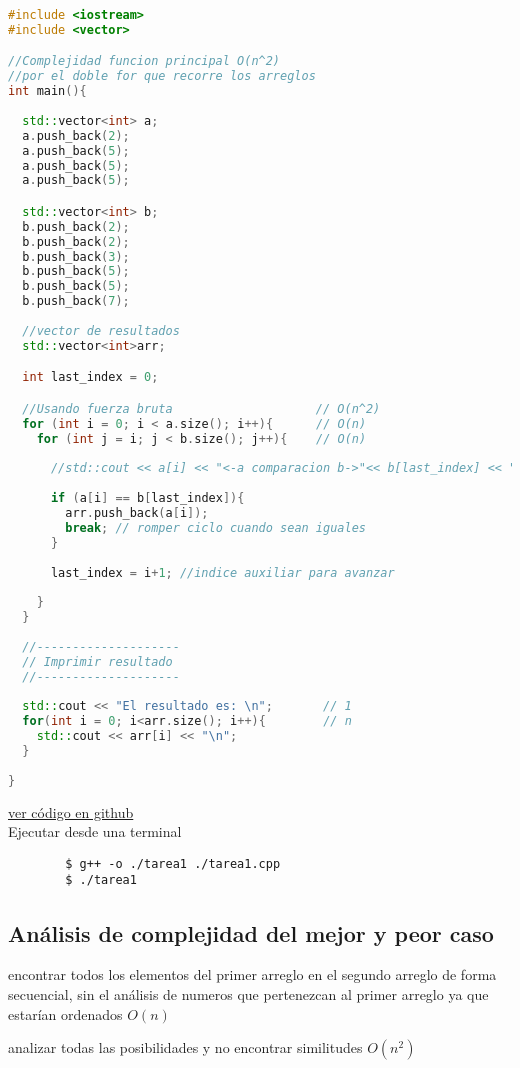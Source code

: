 \documentclass{article}
\begin{document}
\begin{file}
\begin{lstlisting}[language=C++]
#include <iostream>
#include <vector>

//Complejidad funcion principal O(n^2)
//por el doble for que recorre los arreglos
int main(){
  
  std::vector<int> a;
  a.push_back(2);
  a.push_back(5);
  a.push_back(5);
  a.push_back(5);

  std::vector<int> b;
  b.push_back(2);
  b.push_back(2);
  b.push_back(3);
  b.push_back(5);
  b.push_back(5);
  b.push_back(7);
  
  //vector de resultados
  std::vector<int>arr;

  int last_index = 0;

  //Usando fuerza bruta                    // O(n^2)
  for (int i = 0; i < a.size(); i++){      // O(n)
    for (int j = i; j < b.size(); j++){    // O(n)
      
      //std::cout << a[i] << "<-a comparacion b->"<< b[last_index] << "\n";
      
      if (a[i] == b[last_index]){
        arr.push_back(a[i]);
        break; // romper ciclo cuando sean iguales
      }
      
      last_index = i+1; //indice auxiliar para avanzar 
      
    }
  }
  
  //--------------------
  // Imprimir resultado
  //--------------------
  
  std::cout << "El resultado es: \n";       // 1
  for(int i = 0; i<arr.size(); i++){        // n
    std::cout << arr[i] << "\n";
  }
  
}

\end{lstlisting}
\end{file}
\href{https://github.com/luisballado/ADA/blob/main/practice_code/tarea1.cpp}{ver código en github}\\

Ejecutar desde una terminal

\begin{commandline}
	\begin{verbatim}
		$ g++ -o ./tarea1 ./tarea1.cpp
		$ ./tarea1
	\end{verbatim}
\end{commandline}



\newpage
\subsection{Análisis de complejidad del mejor y peor caso}
\begin{warn}
  encontrar todos los elementos del primer arreglo en el segundo arreglo de forma secuencial, sin el análisis de numeros que pertenezcan al primer arreglo ya que estarían ordenados $O(n)$
\end{warn}
\begin{warn}
  analizar todas las posibilidades y no encontrar similitudes $O(n^{2})$
\end{warn}
\end{document}
